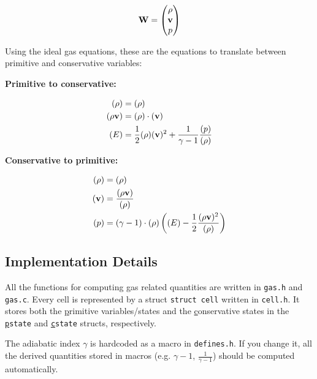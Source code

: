 \begin{align}
	\mathbf{W} = 
		\begin{pmatrix}
			\rho \\ \mathbf{v} \\ p
		\end{pmatrix}
\end{align}



Using the ideal gas equations, these are the equations to translate between primitive and conservative variables:

\textbf{Primitive to conservative:}

\begin{align}
	(\rho) &= (\rho) \\
	(\rho \mathbf{v}) &= (\rho) \cdot (\mathbf{v}) \\
	(E) &= \frac{1}{2} (\rho) (\mathbf{v})^2 + \frac{1}{\gamma - 1} \frac{(p)}{(\rho)}
\end{align}


\textbf{Conservative to primitive:}

\begin{align}
	(\rho) &= (\rho) \\
	(\mathbf{v}) &= \frac{(\rho \mathbf{v} )}{(\rho)}\\
	(p) &= (\gamma - 1) \cdot (\rho)  \left((E) - \frac{1}{2} \frac{(\rho \mathbf{v})^2}{(\rho)} \right) 
\end{align}













\subsection{Implementation Details}

All the functions for computing gas related quantities are written in \verb|gas.h| and \verb|gas.c|.
Every cell is represented by a struct \verb|struct cell| written in \verb|cell.h|.
It stores both the \underline{p}rimitive variables/states and the \underline{c}onservative states in the \texttt{\underline{p}state} and \texttt{\underline{c}state} structs, respectively.

The adiabatic index $\gamma$ is hardcoded as a macro in \texttt{defines.h}.
If you change it, all the derived quantities stored in macros (e.g. $\gamma - 1$, $\frac{1}{\gamma - 1}$) should be computed automatically.

